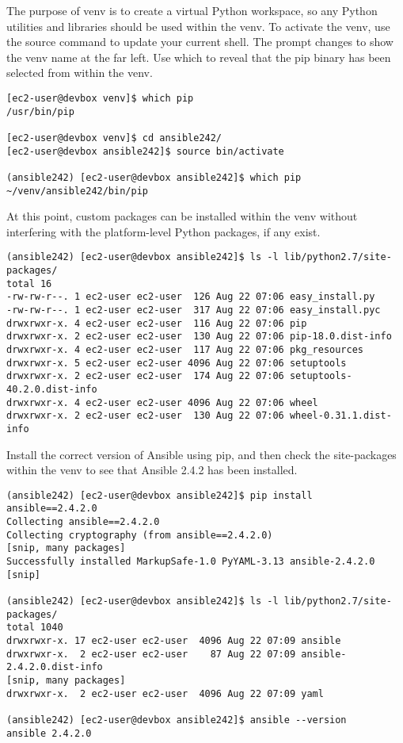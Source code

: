 The purpose of venv is to create a virtual Python workspace, so any Python
utilities and libraries should be used within the venv. To activate the venv,
use the source command to update your current shell. The prompt changes to
show the venv name at the far left. Use which to reveal that the pip binary
has been selected from within the venv.

\begin{verbatim}
[ec2-user@devbox venv]$ which pip
/usr/bin/pip

[ec2-user@devbox venv]$ cd ansible242/
[ec2-user@devbox ansible242]$ source bin/activate

(ansible242) [ec2-user@devbox ansible242]$ which pip
~/venv/ansible242/bin/pip
\end{verbatim}

At this point, custom packages can be installed within the venv without
interfering with the platform-level Python packages, if any exist.

\begin{verbatim}
(ansible242) [ec2-user@devbox ansible242]$ ls -l lib/python2.7/site-packages/
total 16
-rw-rw-r--. 1 ec2-user ec2-user  126 Aug 22 07:06 easy_install.py
-rw-rw-r--. 1 ec2-user ec2-user  317 Aug 22 07:06 easy_install.pyc
drwxrwxr-x. 4 ec2-user ec2-user  116 Aug 22 07:06 pip
drwxrwxr-x. 2 ec2-user ec2-user  130 Aug 22 07:06 pip-18.0.dist-info
drwxrwxr-x. 4 ec2-user ec2-user  117 Aug 22 07:06 pkg_resources
drwxrwxr-x. 5 ec2-user ec2-user 4096 Aug 22 07:06 setuptools
drwxrwxr-x. 2 ec2-user ec2-user  174 Aug 22 07:06 setuptools-40.2.0.dist-info
drwxrwxr-x. 4 ec2-user ec2-user 4096 Aug 22 07:06 wheel
drwxrwxr-x. 2 ec2-user ec2-user  130 Aug 22 07:06 wheel-0.31.1.dist-info
\end{verbatim}

Install the correct version of Ansible using pip, and then check the
site-packages within the venv to see that Ansible 2.4.2 has been installed.

\begin{verbatim}
(ansible242) [ec2-user@devbox ansible242]$ pip install ansible==2.4.2.0
Collecting ansible==2.4.2.0
Collecting cryptography (from ansible==2.4.2.0)
[snip, many packages]
Successfully installed MarkupSafe-1.0 PyYAML-3.13 ansible-2.4.2.0 [snip]

(ansible242) [ec2-user@devbox ansible242]$ ls -l lib/python2.7/site-packages/
total 1040
drwxrwxr-x. 17 ec2-user ec2-user  4096 Aug 22 07:09 ansible
drwxrwxr-x.  2 ec2-user ec2-user    87 Aug 22 07:09 ansible-2.4.2.0.dist-info
[snip, many packages]
drwxrwxr-x.  2 ec2-user ec2-user  4096 Aug 22 07:09 yaml

(ansible242) [ec2-user@devbox ansible242]$ ansible --version
ansible 2.4.2.0
\end{verbatim}

